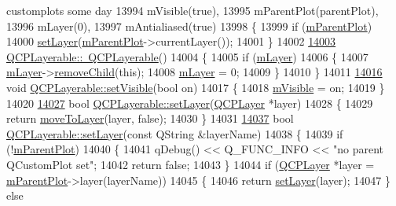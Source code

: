 \begin{DoxyCode}
{       customplots some day}
13994   mVisible(true),
13995   mParentPlot(parentPlot),
13996   mLayer(0),
13997   mAntialiased(true)
13998 \{
13999   \textcolor{keywordflow}{if} (\hyperlink{a00044_aa2a528433e44db02b8aef23c1f9f90ed}{mParentPlot})
14000     \hyperlink{a00044_ab0d0da6d2de45a118886d2c8e16d5a54}{setLayer}(\hyperlink{a00044_aa2a528433e44db02b8aef23c1f9f90ed}{mParentPlot}->currentLayer());
14001 \}
14002 
\hypertarget{a00115_source_l14003}{}\hyperlink{a00044_a4231cf5b3601d6d3a5781283e7a9735b}{14003} \hyperlink{a00044_a4231cf5b3601d6d3a5781283e7a9735b}{QCPLayerable::~QCPLayerable}()
14004 \{
14005   \textcolor{keywordflow}{if} (\hyperlink{a00044_aa38ec5891aff0f50b36fd63e9372a0cd}{mLayer})
14006   \{
14007     \hyperlink{a00044_aa38ec5891aff0f50b36fd63e9372a0cd}{mLayer}->\hyperlink{a00043_ac2f64ac7761650582d968d86670ef362}{removeChild}(\textcolor{keyword}{this});
14008     \hyperlink{a00044_aa38ec5891aff0f50b36fd63e9372a0cd}{mLayer} = 0;
14009   \}
14010 \}
14011 
\hypertarget{a00115_source_l14016}{}\hyperlink{a00044_a3bed99ddc396b48ce3ebfdc0418744f8}{14016} \textcolor{keywordtype}{void} \hyperlink{a00044_a3bed99ddc396b48ce3ebfdc0418744f8}{QCPLayerable::setVisible}(\textcolor{keywordtype}{bool} on)
14017 \{
14018   \hyperlink{a00044_a62e3aed8427d6ce3ccf716f285106cb3}{mVisible} = on;
14019 \}
14020 
\hypertarget{a00115_source_l14027}{}\hyperlink{a00044_ab0d0da6d2de45a118886d2c8e16d5a54}{14027} \textcolor{keywordtype}{bool} \hyperlink{a00044_ab0d0da6d2de45a118886d2c8e16d5a54}{QCPLayerable::setLayer}(\hyperlink{a00043}{QCPLayer} *layer)
14028 \{
14029   \textcolor{keywordflow}{return} \hyperlink{a00044_af94484cfb7cbbddb7de522e9be71d9a4}{moveToLayer}(layer, \textcolor{keyword}{false});
14030 \}
14031 
\hypertarget{a00115_source_l14037}{}\hyperlink{a00044_ab25a0e7b897993b44447caee0f142083}{14037} \textcolor{keywordtype}{bool} \hyperlink{a00044_ab0d0da6d2de45a118886d2c8e16d5a54}{QCPLayerable::setLayer}(\textcolor{keyword}{const} QString &layerName)
14038 \{
14039   \textcolor{keywordflow}{if} (!\hyperlink{a00044_aa2a528433e44db02b8aef23c1f9f90ed}{mParentPlot})
14040   \{
14041     qDebug() << Q\_FUNC\_INFO << \textcolor{stringliteral}{"no parent QCustomPlot set"};
14042     \textcolor{keywordflow}{return} \textcolor{keyword}{false};
14043   \}
14044   \textcolor{keywordflow}{if} (\hyperlink{a00043}{QCPLayer} *layer = \hyperlink{a00044_aa2a528433e44db02b8aef23c1f9f90ed}{mParentPlot}->layer(layerName))
14045   \{
14046     \textcolor{keywordflow}{return} \hyperlink{a00044_ab0d0da6d2de45a118886d2c8e16d5a54}{setLayer}(layer);
14047   \} \textcolor{keywordflow}{else}

\end{DoxyCode}
